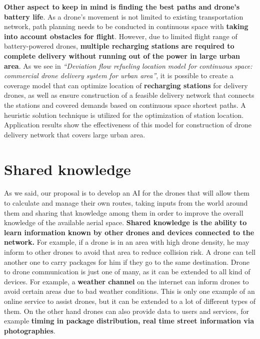 \documentclass[conference]{IEEEtran}
\begin{document}
\textbf{Other aspect to keep in mind is finding the best paths and drone's battery life}. As a drone's movement is not limited to existing transportation network, path planning needs to be conducted in continuous space with \textbf{taking into account obstacles for flight}. However, due to limited flight range of battery-powered drones, \textbf{multiple recharging stations are required to complete delivery without running out of the power in large urban area}. As we see in \textit{``Deviation flow refueling location model for continuous space: commercial drone delivery system for urban area''},  it is possible to create a coverage model that can optimize location of \textbf{recharging stations} for delivery drones, as well as ensure construction of a feasible delivery network that connects the stations and covered demands based on continuous space shortest paths. A heuristic solution technique is utilized for the optimization of station location. Application results show the effectiveness of this model for construction of drone delivery network that covers large urban area.\\



\section{Shared knowledge}

As we said, our proposal is to develop an AI for the drones that will allow them to calculate and manage their own routes, taking inputs from the world around them and sharing that knowledge among them in order to improve the overall knowledge of the available aerial space.
\textbf{Shared knowledge is the ability to learn information known by other drones and devices connected to the network.} 
For example, if a drone is in an area with high drone density, he may inform to other drones to avoid that area to reduce collision risk. A drone can tell another one to carry packages for him if they go to the same destination.
Drone to drone communication is just one of many, as it can be extended to all kind of devices. For example, a \textbf{weather channel} on the internet can inform drones to avoid certain areas due to bad weather conditions. This is only one example of an online service to assist drones, but it can be extended to a lot of different types of them. 
On the other hand drones can also provide data to users and services, for example \textbf{timing in package distribution, real time street information via photographies}.\\
\end{document}
